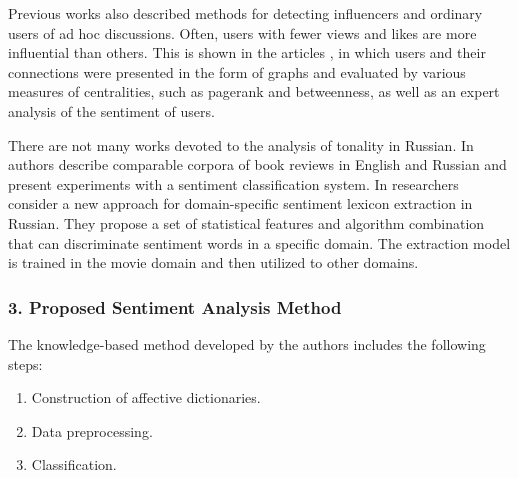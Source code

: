Previous works also described methods for detecting influencers and ordinary users of ad hoc discussions. Often, users with fewer views and likes are more influential than others. This is shown in the articles \cite{BodrunovaLitvinenkoBlekanov2016,BodrunovaLitvinenkoBlekanov2017}, in which users and their connections were presented in the form of graphs and evaluated by various measures of centralities, such as pagerank and betweenness, as well as an expert analysis of the sentiment of users.

There are not many works devoted to the analysis of tonality in Russian. In \cite{BelyatskayaZagibalovCaroll} authors describe comparable corpora of book reviews in English and Russian and present experiments with a sentiment classification system. In \cite{ChetviorkinLoukachevitch} researchers consider a new approach for domain-specific sentiment lexicon extraction in Russian. They propose a set of statistical features and algorithm combination that can discriminate sentiment words in a specific domain. The extraction model is trained in the movie domain and then utilized to other domains.

\subsubsection{3. Proposed Sentiment Analysis Method}

The knowledge-based method developed by the authors includes the following steps:
\begin{enumerate}
	\item Construction of affective dictionaries.
	\item Data preprocessing.
	\item Classification.
\end{enumerate}

